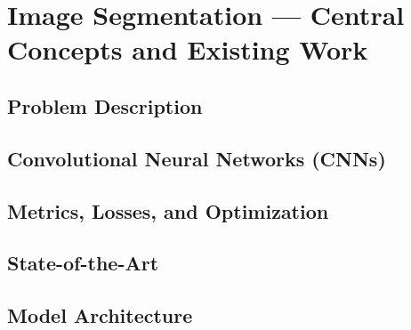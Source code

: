 \section{Image Segmentation --- Central Concepts and Existing Work}%
\label{sec:segmentation}


\subsection{Problem Description}%
\label{sec:segmentation-description}


\subsection{Convolutional Neural Networks (CNNs)}%
\label{sec:cnn}

  
  
  
  
  

\subsection{Metrics, Losses, and Optimization}%
\label{sec:segmentation-metrics}

  

  

  

  

\subsection{State-of-the-Art}%
\label{sec:state-of-the-art}


\subsection{Model Architecture}%
\label{sec:unet}


